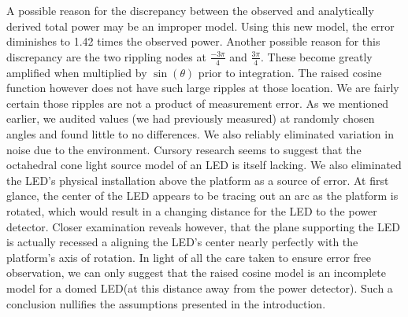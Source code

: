 A possible reason for the discrepancy between the observed and analytically derived total power may be an improper model. Using this new model, the error diminishes to 1.42 times the observed power. Another possible reason for this discrepancy are the two rippling nodes at $\frac{-3\pi}{4}$ and $\frac{3\pi}{4}$. These become greatly amplified when multiplied by $\sin(\theta)$ prior to integration. The raised cosine function however does not have such large ripples at those location. We are fairly certain those ripples are not a product of measurement error. As we mentioned earlier, we audited values (we had previously measured) at randomly chosen angles and found little to no differences. We also reliably eliminated variation in noise due to the environment. 
\newline 
Cursory research seems to suggest that the octahedral cone light source model of an LED is itself lacking. We also eliminated the LED's physical installation above the platform as a source of error. At first glance, the center of the LED appears to be tracing out an arc as the platform is rotated, which would result in a changing distance for the LED to the power detector. Closer examination reveals however, that the plane supporting the LED is actually recessed a aligning the LED's center nearly perfectly with the platform's axis of rotation. In light of all the care taken to ensure error free observation, we can only suggest that the raised cosine model is an incomplete model for a domed LED(at this distance away from the power detector). Such a conclusion nullifies the assumptions presented in the introduction.